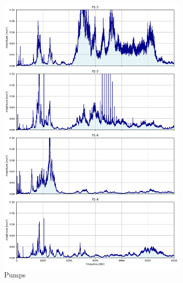 \begin{figure}[h]
\begin{subfigure}[b]{0.32\textwidth}
        \includegraphics[width=\textwidth]{assets/results/eda/frequency-spectrum-pumps.png}
        \caption{Pumps}
    \end{subfigure}
    \hfill
    \begin{subfigure}[b]{0.32\textwidth}

\end{subfigure}
\end{figure}
